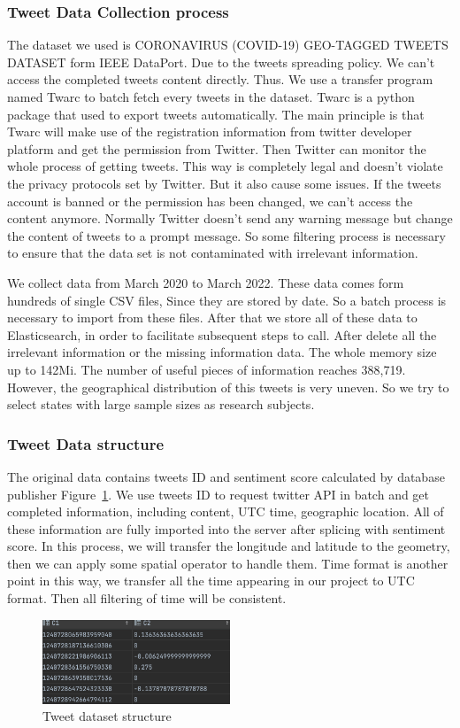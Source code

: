 \subsubsection{Tweet Data Collection process}
The dataset we used is CORONAVIRUS (COVID-19) GEO-TAGGED TWEETS DATASET form
IEEE DataPort. Due to the tweets spreading policy. We can't access the
completed tweets content directly.  Thus. We use a transfer program named
Twarc to batch fetch every tweets in the dataset. Twarc is a python package
that used to export tweets automatically.  The main principle is that Twarc
will make use of the registration information from twitter developer platform
and get the permission from Twitter. Then Twitter can monitor the whole
process of getting tweets. This way is completely legal and doesn't violate
the privacy protocols set by Twitter. But it also cause some issues. If the
tweets account is banned or the permission has been changed, we can't access
the content anymore. Normally Twitter doesn't send any warning message but
change the content of tweets to a prompt message. So some filtering process
is necessary to ensure that the data set is not contaminated with irrelevant
information. 

We collect data from March 2020 to March 2022. These data comes form hundreds
of single CSV files, Since they are stored by date. So a batch process is
necessary to import from these files. After that we store all of these data
to Elasticsearch, in order to facilitate subsequent steps to call. After
delete all the irrelevant information or the missing information data. The
whole memory size up to 142Mi. The number of useful pieces of information
reaches 388,719. However, the geographical distribution of this tweets is
very uneven. So we try to select states with large sample sizes as research
subjects. 

\subsubsection{Tweet Data structure}
The original data contains tweets ID and sentiment score calculated by
database publisher Figure~\ref{fig:Research process}. We use tweets ID to request twitter API in batch
and get completed information, including content, UTC time, geographic
location. All of these information are fully imported into the server after
splicing with sentiment score.  In this process, we will transfer the
longitude and latitude to the geometry, then we can apply some spatial
operator to handle them. Time format is another point in this way, we
transfer all the time appearing in our project to UTC format. Then all
filtering of time will be consistent. 
\begin{figure}[h]
\centering
\includegraphics[width=0.5\textwidth]{imgs/row_tweets.png}
\caption{\label{fig:Research process}Tweet dataset structure}
\end{figure}
